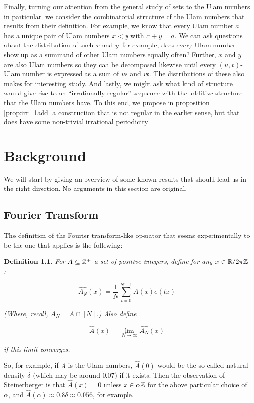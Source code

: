 \documentclass{report}
\newtheorem{definition}[theorem]{Definition}
\theoremstyle{remark}
\numberwithin{equation}{section}
\begin{document}
Finally, turning our attention from the general study of \relevant
sets to the Ulam numbers in particular, we consider the combinatorial
structure of the Ulam numbers that results from their definition.  For
example, we know that every Ulam number $a$ has a unique pair of Ulam
numbers $x < y$ with $x + y = a$.  We can ask questions about the
distribution of such $x$ and $y$--for example, does every Ulam number
show up as a summand of other Ulam numbers equally often?  Further,
$x$ and $y$ are also Ulam numbers so they can be decomposed likewise
until every $(u,v)$-Ulam number is expressed as a sum of $u$s and
$v$s.  The distributions of these also makes for interesting study.
And lastly, we might ask what kind of structure would give rise to an
``irrationally regular'' sequence with the additive structure that the
Ulam numbers have.  To this end, we propose in proposition
\ref{prop:irr_1add} a construction that is not regular in the earlier
sense, but that does have some non-trivial irrational periodicity.

\chapter{Background}

We will start by giving an overview of some known results that should
lead us in the right direction.  No arguments in this section are
original.

\section{Fourier Transform}

The definition of the Fourier transform-like operator that seems
experimentally to be the one that applies is the following:

\begin{definition}\label{def:fourier}
For $A \subseteq \mathbb{Z}^+$ a set of positive integers, define for any
$x\in \mathbb{R}/2\pi\mathbb{Z}$: 

\[\widehat{A_N}(x) = \frac{1}{N} \sum_{t=0}^{N-1} A(x) e(tx)\]

(Where, recall, $A_N = A \cap [N]$.)  Also define

\[\widehat{A}(x) = \lim_{N \to \infty} \widehat{A_N}(x)\]

if this limit converges.  
\end{definition}

So, for example, if $A$ is the Ulam numbers, $\widehat{A}(0)$ would be
the so-called natural density $\delta$ (which may be around $0.07$) if
it exists.  Then the observation of Steinerberger is that
$\widehat{A}(x) = 0$ unless $x \in \alpha\mathbb{Z}$ for the above particular
choice of $\alpha$, and
$\widehat{A}(\alpha) \approx 0.8\delta \approx 0.056$, for example.
\end{document}
